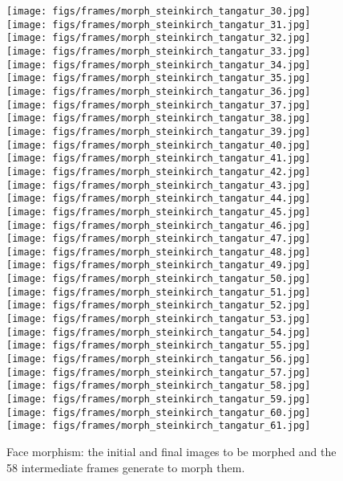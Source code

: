 \documentclass[11pt]{article}
\begin{document}
\begin{figure}[H]
\begin{center}
\texttt{[image: figs/frames/morph\_steinkirch\_tangatur\_30.jpg]} 
\texttt{[image: figs/frames/morph\_steinkirch\_tangatur\_31.jpg]} 
\texttt{[image: figs/frames/morph\_steinkirch\_tangatur\_32.jpg]} 
\texttt{[image: figs/frames/morph\_steinkirch\_tangatur\_33.jpg]} 
\texttt{[image: figs/frames/morph\_steinkirch\_tangatur\_34.jpg]} 
\texttt{[image: figs/frames/morph\_steinkirch\_tangatur\_35.jpg]} 
\texttt{[image: figs/frames/morph\_steinkirch\_tangatur\_36.jpg]}  
\texttt{[image: figs/frames/morph\_steinkirch\_tangatur\_37.jpg]} 
\texttt{[image: figs/frames/morph\_steinkirch\_tangatur\_38.jpg]} 
\texttt{[image: figs/frames/morph\_steinkirch\_tangatur\_39.jpg]} 
\texttt{[image: figs/frames/morph\_steinkirch\_tangatur\_40.jpg]} 
\texttt{[image: figs/frames/morph\_steinkirch\_tangatur\_41.jpg]} 
\texttt{[image: figs/frames/morph\_steinkirch\_tangatur\_42.jpg]} 
\texttt{[image: figs/frames/morph\_steinkirch\_tangatur\_43.jpg]}  
\texttt{[image: figs/frames/morph\_steinkirch\_tangatur\_44.jpg]} 
\texttt{[image: figs/frames/morph\_steinkirch\_tangatur\_45.jpg]} 
\texttt{[image: figs/frames/morph\_steinkirch\_tangatur\_46.jpg]} 
\texttt{[image: figs/frames/morph\_steinkirch\_tangatur\_47.jpg]} 
\texttt{[image: figs/frames/morph\_steinkirch\_tangatur\_48.jpg]} 
\texttt{[image: figs/frames/morph\_steinkirch\_tangatur\_49.jpg]} 
\texttt{[image: figs/frames/morph\_steinkirch\_tangatur\_50.jpg]}  
\texttt{[image: figs/frames/morph\_steinkirch\_tangatur\_51.jpg]} 
\texttt{[image: figs/frames/morph\_steinkirch\_tangatur\_52.jpg]} 
\texttt{[image: figs/frames/morph\_steinkirch\_tangatur\_53.jpg]} 
\texttt{[image: figs/frames/morph\_steinkirch\_tangatur\_54.jpg]} 
\texttt{[image: figs/frames/morph\_steinkirch\_tangatur\_55.jpg]} 
\texttt{[image: figs/frames/morph\_steinkirch\_tangatur\_56.jpg]} 
\texttt{[image: figs/frames/morph\_steinkirch\_tangatur\_57.jpg]}  
\texttt{[image: figs/frames/morph\_steinkirch\_tangatur\_58.jpg]} 
\texttt{[image: figs/frames/morph\_steinkirch\_tangatur\_59.jpg]} 
\texttt{[image: figs/frames/morph\_steinkirch\_tangatur\_60.jpg]} 
\texttt{[image: figs/frames/morph\_steinkirch\_tangatur\_61.jpg]} 


\caption{Face morphism: the initial and final images to be morphed and the 58 intermediate frames generate to morph them.}
\label{frames}
\end{center}
\end{figure}
\end{document}
